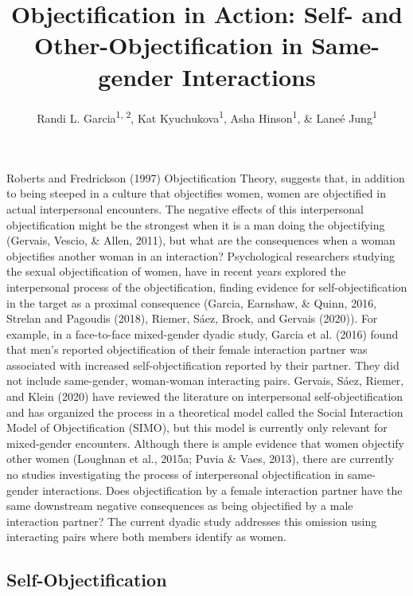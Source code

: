 \documentclass[man]{apa6}
\title{Objectification in Action: Self- and Other-Objectification in
Same-gender Interactions}
\author{Randi L. Garcia\textsuperscript{1, 2}, Kat
Kyuchukova\textsuperscript{1}, Asha Hinson\textsuperscript{1}, \& Laneé
Jung\textsuperscript{1}}
\date{}
\affiliation{
\vspace{0.5cm}
\textsuperscript{1} Department of Psychology, Smith College\\\textsuperscript{2} Program in Statistical and Data Sciences, Smith College}
\begin{document}
\maketitle

Roberts and Fredrickson (1997) Objectification Theory, suggests that, in
addition to being steeped in a culture that objectifies women, women are
objectified in actual interpersonal encounters. The negative effects of
this interpersonal objectification might be the strongest when it is a
man doing the objectifying (Gervais, Vescio, \& Allen, 2011), but what
are the consequences when a woman objectifies another woman in an
interaction? Psychological researchers studying the sexual
objectification of women, have in recent years explored the
interpersonal process of the objectification, finding evidence for
self-objectification in the target as a proximal consequence (Garcia,
Earnshaw, \& Quinn, 2016, Strelan and Pagoudis (2018), Riemer, Sáez,
Brock, and Gervais (2020)). For example, in a face-to-face mixed-gender
dyadic study, Garcia et al. (2016) found that men's reported
objectification of their female interaction partner was associated with
increased self-objectification reported by their partner. They did not
include same-gender, woman-woman interacting pairs. Gervais, Sáez,
Riemer, and Klein (2020) have reviewed the literature on interpersonal
self-objectification and has organized the process in a theoretical
model called the Social Interaction Model of Objectification (SIMO), but
this model is currently only relevant for mixed-gender encounters.
Although there is ample evidence that women objectify other women
(Loughnan et al., 2015a; Puvia \& Vaes, 2013), there are currently no
studies investigating the process of interpersonal objectification in
same-gender interactions. Does objectification by a female interaction
partner have the same downstream negative consequences as being
objectified by a male interaction partner? The current dyadic study
addresses this omission using interacting pairs where both members
identify as women.

\subsection{Self-Objectification}\label{self-objectification}
\end{document}
